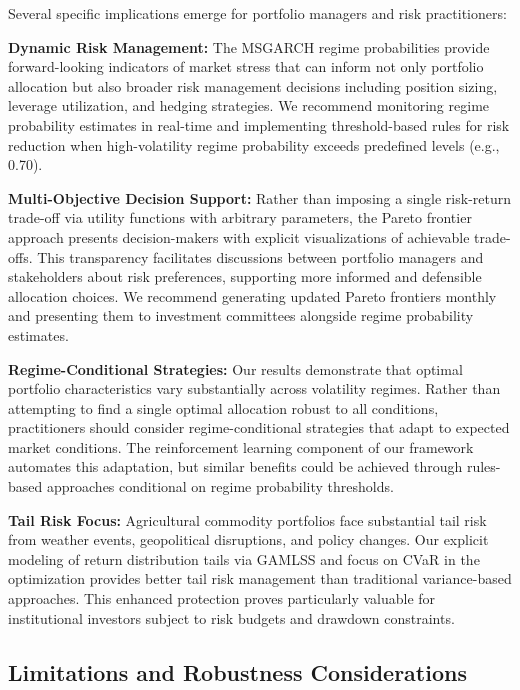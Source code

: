 \documentclass[
  10pt,
  a4paper,
]{article}
\begin{document}
\begin{tcolorbox}
Several specific implications emerge for portfolio managers and risk
practitioners:

\textbf{Dynamic Risk Management:} The MSGARCH regime probabilities
provide forward-looking indicators of market stress that can inform not
only portfolio allocation but also broader risk management decisions
including position sizing, leverage utilization, and hedging strategies.
We recommend monitoring regime probability estimates in real-time and
implementing threshold-based rules for risk reduction when
high-volatility regime probability exceeds predefined levels (e.g.,
0.70).

\textbf{Multi-Objective Decision Support:} Rather than imposing a single
risk-return trade-off via utility functions with arbitrary parameters,
the Pareto frontier approach presents decision-makers with explicit
visualizations of achievable trade-offs. This transparency facilitates
discussions between portfolio managers and stakeholders about risk
preferences, supporting more informed and defensible allocation choices.
We recommend generating updated Pareto frontiers monthly and presenting
them to investment committees alongside regime probability estimates.

\textbf{Regime-Conditional Strategies:} Our results demonstrate that
optimal portfolio characteristics vary substantially across volatility
regimes. Rather than attempting to find a single optimal allocation
robust to all conditions, practitioners should consider
regime-conditional strategies that adapt to expected market conditions.
The reinforcement learning component of our framework automates this
adaptation, but similar benefits could be achieved through rules-based
approaches conditional on regime probability thresholds.

\textbf{Tail Risk Focus:} Agricultural commodity portfolios face
substantial tail risk from weather events, geopolitical disruptions, and
policy changes. Our explicit modeling of return distribution tails via
GAMLSS and focus on CVaR in the optimization provides better tail risk
management than traditional variance-based approaches. This enhanced
protection proves particularly valuable for institutional investors
subject to risk budgets and drawdown constraints.

\subsection{Limitations and Robustness
Considerations}\label{limitations-and-robustness-considerations}


\end{tcolorbox}
\end{document}
